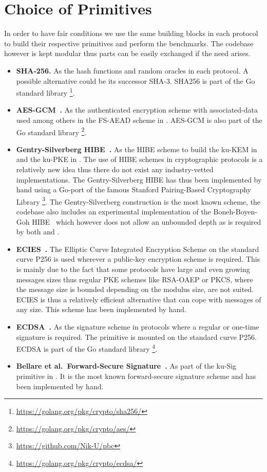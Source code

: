 \documentclass[11pt,a4paper,twoside,openright,bibliography=totoc]{scrbook}
\begin{document}
\section{Choice of Primitives}
\label{sec:choice-primitives}

In order to have fair conditions we use the same building blocks
in each protocol to build their respective primitives and
perform the benchmarks. The
codebase however is kept modular thus parts can be easily
exchanged if the need arises.
\begin{itemize}
\item \textbf{SHA-256.} As the hash functions and random
  oracles in each protocol. A possible alternative could be
  its successor SHA-3. SHA256 is part of the Go standard
  library \footnote{\url{https://golang.org/pkg/crypto/sha256/}}.
\item \textbf{AES-GCM~\cite{mcgrew2004security}.} As the authenticated
  encryption scheme with
  associated-data used among others in the FS-AEAD scheme in \cite{alwen2018double}.
  AES-GCM is also part of the Go standard
  library \footnote{\url{https://golang.org/pkg/crypto/aes/}}.
\item \textbf{Gentry-Silverberg HIBE~\cite{gentry2002hierarchical}.} As
  the HIBE scheme to build the ku-KEM in \cite{poettering2018towards} and
  the ku-PKE in \cite{jaeger2018optimal}. The use of HIBE schemes in
  cryptographic protocols is a relatively new idea thus there do not
  exist any industry-vetted implementations. The Gentry-Silverberg HIBE
  has thus been implemented by hand using a Go-port of the
  famous Stanford Pairing-Based Cryptography
  Library \footnote{\url{https://github.com/Nik-U/pbc}}.
  The Gentry-Silverberg construction is the most known scheme,
  the codebase also includes an experimental implementation of
  the Boneh-Boyen-Goh HIBE~\cite{boneh2005hierarchical} which however does
  not allow an unbounded
  depth as is required by both \cite{poettering2018towards} and
  \cite{jaeger2018optimal}.
\item \textbf{ECIES~\cite{shoup2001proposal}.} The Elliptic Curve Integrated
  Encryption Scheme on the standard curve P256 is used wherever a public-key
  encryption scheme is required. This is mainly due to the fact that
  some protocols have large and even growing messages sizes thus regular
  PKE schemes like RSA-OAEP or PKCS, where the message size is bounded
  depending on the modulus size, are not suited. ECIES is thus a
  relatively efficient alternative that can cope with messages
  of any size. This scheme has been implemented by hand.
\item \textbf{ECDSA~\cite{johnson2001elliptic}.} As the signature scheme in protocols where
  a regular or one-time signature is required. The primitive
  is mounted on the standard curve P256. ECDSA is part of the
  Go standard library \footnote{\url{https://golang.org/pkg/crypto/ecdsa/}}.
\item \textbf{Bellare et al.~Forward-Secure Signature~\cite{bellare1999forward}.}
  As part of the ku-Sig primitive in \cite{jaeger2018optimal}. It
  is the most known forward-secure signature scheme and has been implemented
  by hand.
\end{itemize}
\end{document}
